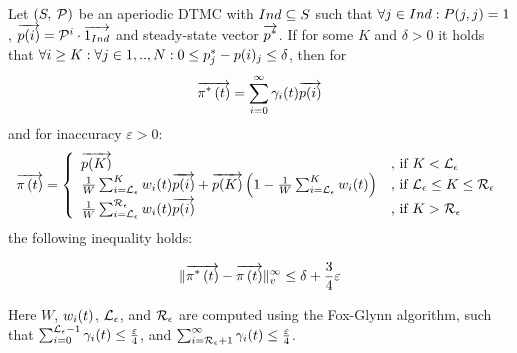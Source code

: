 \documentclass{entcs}
\begin{document}
		\begin{theorem}
			Let $\left( S,\: \mathcal{P} \right)$ be an aperiodic DTMC with $Ind \subseteq S$ such that $\forall j \in Ind : P(j,j) = 1$, $\overrightarrow{p(i)}=\mathcal{P}^{i} \cdot \overrightarrow{1_{Ind}}$ and steady-state vector $\overrightarrow{p^{*}}$. If for some $K$ and $\delta > 0$ it holds that $\forall i \geq K : \forall j \in 1,..,N : 0 \leq p^{*}_{j} - p(i)_{j} \leq \delta$, then for 
			{\small
			\[
				\overrightarrow{\pi^{*} \left( t \right)} = \sum_{i=0}^{\infty}\gamma_{i}(t) \overrightarrow{p(i)}
			\]
			}
			and for inaccuracy $\varepsilon > 0$:
			{\small
			\begin{equation}
				\displaystyle
				\overrightarrow{\pi \left( t \right) } = \left\{
				\begin{array}{ll}
					\overrightarrow{p(K)} & \text{, if } K < \mathcal{L}_{\epsilon}\\
					\frac{1}{W} \sum_{i=\mathcal{L}_{\epsilon}}^{K}w_{i}(t) \overrightarrow{p(i)} + \overrightarrow{p(K)} \left(1- \frac{1}{W} \sum_{i=\mathcal{L}_{\epsilon}}^{K}w_{i}(t) \right) & \text{, if } \mathcal{L}_{\epsilon} \leq K \leq \mathcal{R}_{\epsilon}\\
					\frac{1}{W} \sum_{i=\mathcal{L}_{\epsilon}}^{\mathcal{R}_{\epsilon}}w_{i}(t) \overrightarrow{p(i)} & \text{, if } K > \mathcal{R}_{\epsilon}\\
				\end{array}
				\right .
				\nonumber
			\end{equation}
			}
			the following inequality holds:
			{\small
			\begin{fframe}{0.5}{-0.0}
				\[
					\lVert   \overrightarrow{\pi^{*} \left( t \right)} - \overrightarrow{\pi \left( t \right) }   \rVert_{v}^{\infty} \leq \delta + \frac{3}{4} \varepsilon
				\]
			\end{fframe}
			}
			Here $W$, $w_{i}(t)$, $\mathcal{L}_{\epsilon}$, and $\mathcal{R}_{\epsilon}$ are computed using the Fox-Glynn algorithm, such that $\sum_{i=0}^{\mathcal{L}_{\epsilon}-1} \gamma_{i}(t) \leq \frac{\varepsilon}{4}$, and $\sum_{i=\mathcal{R}_{\epsilon}+1}^{\infty} \gamma_{i}(t) \leq \frac{\varepsilon}{4}$.
		\end{theorem}
\end{document}
